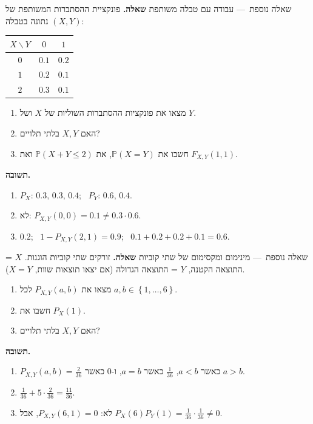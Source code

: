\documentclass[11pt,a4paper]{report}
\newcommand{\set}[1]{\left\{#1\right\}}
\newcommand{\PP}{\mathbb{P}}
\newcommand{\dash}{{\rmfamily —}}
\begin{document}
\begin{suggestion}{שאלה נוספת~\dash{} עבודה עם טבלה משותפת}
\textbf{שאלה.} פונקציית ההסתברות המשותפת של $(X,Y)$ נתונה בטבלה:
\begin{center}
\renewcommand{\arraystretch}{1.3}
\begin{tabular}{c|cc}
  $X\backslash Y$ & $0$ & $1$\\ \hline
  $0$ & $0.1$ & $0.2$\\
  $1$ & $0.2$ & $0.1$\\
  $2$ & $0.3$ & $0.1$
\end{tabular}
\end{center}
\begin{enumerate}[label=(\alph*),itemsep=1pt,topsep=2pt]
  \item מצאו את פונקציות ההסתברות השוליות של $X$ ושל $Y$.
  \item האם $X,Y$ בלתי תלויים?
  \item חשבו את $\PP(X=Y)$, את $\PP(X+Y\le2)$ ואת $F_{X,Y}(1,1)$.
\end{enumerate}

\textbf{תשובה.}
\begin{enumerate}[label=(\alph*),itemsep=1pt,topsep=2pt]
  \item $P_X$: $0.3,\,0.3,\,0.4$; \ $P_Y$: $0.6,\,0.4$.
  \item לא: $P_{X,Y}(0,0)=0.1\neq0.3\cdot0.6$.
  \item $0.2$; \ $1-P_{X,Y}(2,1)=0.9$; \ $0.1+0.2+0.2+0.1=0.6$.
\end{enumerate}
\end{suggestion}

\begin{suggestion}{שאלה נוספת~\dash{} מינימום ומקסימום של שתי קוביות}
\textbf{שאלה.} זורקים שתי קוביות הוגנות. $X$ = התוצאה הקטנה, $Y$ = התוצאה הגדולה (אם יצאו תוצאות שוות, $X=Y$).
\begin{enumerate}[label=(\alph*),itemsep=1pt,topsep=2pt]
  \item מצאו את $P_{X,Y}(a,b)$ לכל $a,b\in\set{1,\dots,6}$.
  \item חשבו את $P_X(1)$.
  \item האם $X,Y$ בלתי תלויים?
\end{enumerate}

\textbf{תשובה.}
\begin{enumerate}[label=(\alph*),itemsep=1pt,topsep=2pt]
  \item $P_{X,Y}(a,b)=\frac2{36}$ כאשר $a<b$, $\frac1{36}$ כאשר $a=b$, ו-$0$ כאשר $a>b$.
  \item $\frac1{36}+5\cdot\frac2{36}=\frac{11}{36}$.
  \item לא: $P_{X,Y}(6,1)=0$, אבל $P_X(6)P_Y(1)=\frac1{36}\cdot\frac1{36}\neq0$.
\end{enumerate}
\end{suggestion}
\end{document}
